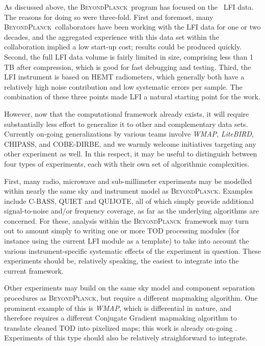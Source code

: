 \documentclass[onecolumn]{aa}
\def\WMAP{\emph{WMAP}}
\newcommand{\BP}{\textsc{BeyondPlanck}}
\begin{document}
As discussed above, the \BP\ program has focused on the \Planck\ LFI
data. The reasons for doing so were three-fold. First and foremost,
many \BP\ collaborators have been working with the LFI data for one or
two decades, and the aggregated experience with this data set within
the collaboration implied a low start-up cost; results could be
produced quickly. Second, the full LFI data volume is fairly limited
in size, comprising less than 1\,TB after compression, which is good
for fast debugging and testing. Third, the LFI instrument is based on
HEMT radiometers, which generally both have a relatively high noise
contribution and low systematic errors per sample. The combination of
these three points made LFI a natural starting point for the work.

However, now that the computational framework already exists, it will
require substantially less effort to generalize it to other and
complementary data sets. Currently on-going generalizations by various
teams involve \WMAP, \emph{LiteBIRD}, CHIPASS, and COBE-DIRBE, and we
warmly welcome initiatives targeting any other experiment as well. In
this respect, it may be useful to distinguish between four types of
experiments, each with their own set of algorithmic complexities.

First, many radio, microwave and sub-millimeter experiments may be
modelled within nearly the same sky and instrument model as
\BP. Examples include C-BASS, QUIET and QUIJOTE, all of which simply
provide additional signal-to-noise and/or frequency coverage, as far
as the underlying algorithms are concerned. For these, analysis within
the \BP\ framework may turn out to amount simply to writing one or
more TOD processing modules (for instance using the current LFI module
as a template) to take into account the various instrument-specific
systematic effects of the experiment in question. These experiments
should be, relatively speaking, the easiest to integrate into the
current framework.

Other experiments may build on the same sky model and component
separation procedures as \BP, but require a different mapmaking
algorithm. One prominent example of this is \WMAP, which is
differential in nature, and therefore requires a different Conjugate
Gradient mapmaking algorithm to translate cleaned TOD into pixelized
maps; this work is already on-going \citep{bp17}. Experiments of this type should
also be relatively straighforward to integrate.
\end{document}

